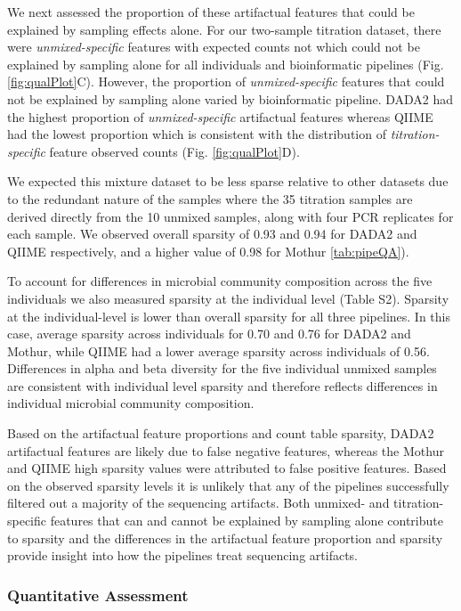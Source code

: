 \documentclass[linenumbers]{bmcart}
\begin{document}
We next assessed the proportion of these artifactual features that could be explained by sampling effects alone. For our two-sample titration dataset, there were
\emph{unmixed-specific} features with expected counts not which could not be explained by sampling
alone for all individuals and bioinformatic pipelines (Fig.
\ref{fig:qualPlot}C). However, the proportion of \emph{unmixed-specific}
features that could not be explained by sampling alone varied by
bioinformatic pipeline. DADA2 had the highest proportion of
\emph{unmixed-specific} artifactual features whereas QIIME had
the lowest proportion which is consistent with the distribution
of \emph{titration-specific} feature observed counts (Fig. \ref{fig:qualPlot}D).


We expected this mixture dataset to be less sparse relative to other datasets due
to the redundant nature of the samples where the 35 titration samples are derived
directly from the 10 unmixed samples, along with four PCR replicates for
each sample. We observed overall sparsity of 0.93 and 0.94 for DADA2 and QIIME respectively, and a higher value of 0.98 for Mothur \ref{tab:pipeQA}). 

To account for differences in microbial community composition across the five individuals we also measured sparsity at the individual level (Table S2).
Sparsity at the individual-level is lower than overall sparsity for all three pipelines. In this case, average sparsity across individuals for 0.70 and 0.76 for DADA2 and Mothur, while QIIME had a lower average sparsity across individuals of 0.56. Differences in alpha and beta diversity for the five individual unmixed samples are consistent with individual level sparsity and therefore reflects differences in individual microbial community composition.


Based on the artifactual feature proportions and count table sparsity, 
DADA2 artifactual features are likely due to false negative features, whereas the Mothur and QIIME high sparsity values were attributed to false positive features. 
Based on the observed sparsity levels it is unlikely that any of the pipelines successfully filtered out a
majority of the sequencing artifacts. Both unmixed- and titration-specific
features that can and cannot be explained by sampling alone contribute
to sparsity and the differences in the artifactual feature proportion
and sparsity provide insight into how the pipelines treat sequencing artifacts.


\subsubsection*{Quantitative Assessment}
\end{document}

